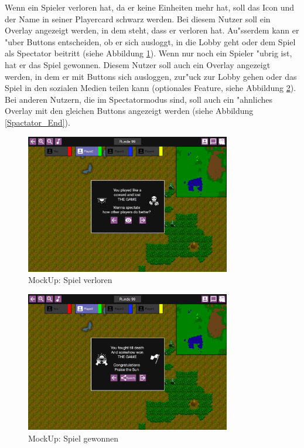 \documentclass[12pt, titlepage]{scrartcl}
\newcounter{subsubsubsection}[subsubsection]
\begin{document}
			        Wenn ein Spieler verloren hat, da er keine Einheiten mehr hat, soll das Icon und der Name in seiner Playercard schwarz werden. Bei diesem Nutzer soll ein Overlay angezeigt werden, in dem steht, dass er verloren hat. Au"sserdem kann er "uber Buttons entscheiden, ob er sich ausloggt, in die Lobby geht oder dem Spiel als Spectator beitritt (siehe Abbildung \ref{Game_Lost}). Wenn nur noch ein Spieler "ubrig ist, hat er das Spiel gewonnen. Diesem Nutzer soll auch ein Overlay angezeigt werden, in dem er mit Buttons sich ausloggen, zur"uck zur Lobby gehen oder das Spiel in den sozialen Medien teilen kann (optionales Feature, siehe Abbildung \ref{Game_Won}). Bei anderen Nutzern, die im Spectatormodus sind, soll auch ein "ahnliches Overlay mit den gleichen Buttons angezeigt werden (siehe Abbildung \ref{Spactator_End}).
			        \begin{figure}[H] 
    				    \centering
    				    \includegraphics[width=0.8\textwidth]{images/mockUps/GameLost.png}
    				    \caption{MockUp: Spiel verloren}
    				    \label{Game_Lost}
			        \end{figure}
			        \begin{figure}[H] 
    				    \centering
    				    \includegraphics[width=0.8\textwidth]{images/mockUps/GameWon.png}
    				    \caption{MockUp: Spiel gewonnen}
    				    \label{Game_Won}
			        \end{figure}
\end{document}
